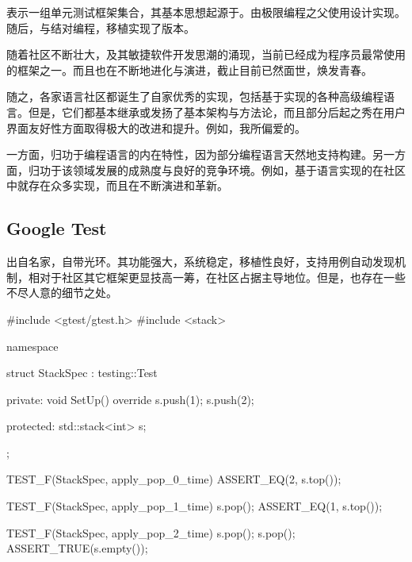\begin{content}

表示一组单元测试框架集合，其基本思想起源于。由极限编程之父使用设计实现。随后，与结对编程，移植实现了版本。

随着社区不断壮大，及其敏捷软件开发思潮的涌现，当前已经成为程序员最常使用的框架之一。而且也在不断地进化与演进，截止目前已然面世，焕发青春。

随之，各家语言社区都诞生了自家优秀的实现，包括基于实现的各种高级编程语言。但是，它们都基本继承或发扬了基本架构与方法论，而且部分后起之秀在用户界面友好性方面取得极大的改进和提升。例如，我所偏爱的。

一方面，归功于编程语言的内在特性，因为部分编程语言天然地支持构建。另一方面，归功于该领域发展的成熟度与良好的竞争环境。例如，基于\cpp{}语言实现的在社区中就存在众多实现，而且在不断演进和革新。

\subsection{Google Test}

出自名家，自带光环。其功能强大，系统稳定，移植性良好，支持用例自动发现机制，相对于社区其它框架更显技高一筹，在社区占据主导地位。但是，也存在一些不尽人意的细节之处。

\begin{leftbar}
 \begin{c++}[caption={\ttfamily{Google Test样例}}]
#include <gtest/gtest.h>
#include <stack>

namespace {
  struct StackSpec : testing::Test {
  private:
    void SetUp() override {
      s.push(1);
      s.push(2);
    }

  protected:
    std::stack<int> s;
  };
}

TEST_F(StackSpec, apply_pop_0_time) {
  ASSERT_EQ(2, s.top());
}

TEST_F(StackSpec, apply_pop_1_time) {
  s.pop();
  ASSERT_EQ(1, s.top());
}

TEST_F(StackSpec, apply_pop_2_time) {
  s.pop();
  s.pop();
  ASSERT_TRUE(s.empty());
}
 \end{c++}
\end{leftbar}


\end{content}
